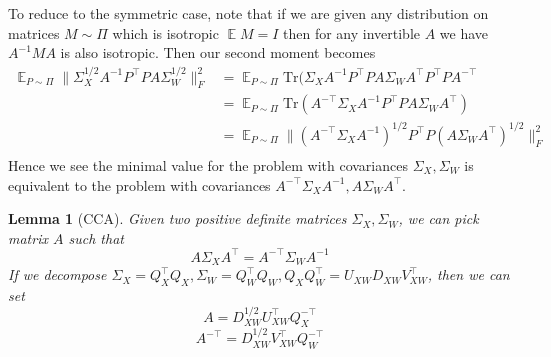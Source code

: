 \documentclass{article}
\newtheorem{lemma}[theorem]{Lemma}
\theoremstyle{definition}
\theoremstyle{plain}
\DeclareMathOperator{\E}{\mathbb{E}}
\begin{document}
To reduce to the symmetric case, note that if we are given any distribution on matrices $M \sim \Pi$ which is isotropic $\E M = I$ then for any invertible $A$ we have $A^{-1} M A$ is also isotropic. Then our second moment becomes 
\begin{align*}
    \E_{P \sim \Pi} \| \Sigma_X^{1/2} A^{-1} P^\top P A \Sigma_W^{1/2} \|_F^2 &= \E_{P \sim \Pi} \text{Tr}(\Sigma_X A^{-1} P^\top P A \Sigma_W A^\top P^\top P A^{-\top} \\
    &= \E_{P \sim \Pi} \text{Tr}(A^{-\top} \Sigma_X A^{-1} P^\top P A \Sigma_W A^\top) \\
    &= \E_{P \sim \Pi} \|(A^{-\top} \Sigma_X A^{-1})^{1/2} P^\top P (A \Sigma_W A^\top)^{1/2} \|_F^2 \\
\end{align*}
Hence we see the minimal value for the problem with covariances $\Sigma_X, \Sigma_W$ is equivalent to the problem with covariances $A^{-\top} \Sigma_X A^{-1}, A  \Sigma_W A^\top$. 
\begin{lemma}[CCA]
Given two positive definite matrices $\Sigma_X, \Sigma_W$, we can pick matrix $A$ such that 
\[A  \Sigma_X A^\top =  A^{-\top} \Sigma_W A^{-1}  \]
If we decompose $\Sigma_X = Q_X^\top Q_X, \Sigma_W = Q_W^\top Q_W, Q_X Q_W^\top = U_{XW} D_{XW} V_{XW}^\top$, then we can set
\[ A = D_{XW}^{1/2} U_{XW}^\top Q_X^{-\top} \]
\[ A^{-\top} = D_{XW}^{1/2} V_{XW}^\top Q_W^{-\top} \]
\end{lemma}
\end{document}
